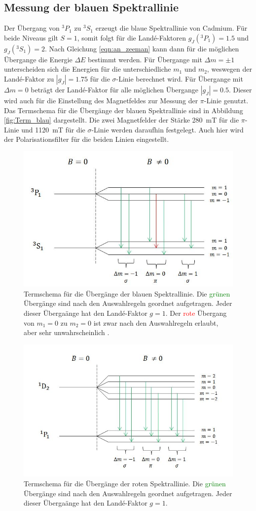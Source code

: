 \subsection{Messung der blauen Spektrallinie}
Der Übergang von $^3P_1$ zu $^3S_1$ erzeugt die blaue Spektrallinie von Cadmium.
Für beide Niveaus gilt $S=1$, somit folgt für die Landé-Faktoren $g_J(^3P_1) = \num{1.5}$ und $g_J(^3S_1) = \num{2}$.
Nach Gleichung \ref{eqn:an_zeeman} kann dann für die möglichen Übergange die Energie $\Delta E$ bestimmt werden.
Für Übergange mit $\Delta m = \pm 1$ unterscheiden sich die Energien für die unterschiedliche $m_1$ und $m_2$, weswegen der Landé-Faktor zu $|g_J| = \num{1.75}$ für die $\sigma$-Linie berechnet wird.
Für Übergange mit $\Delta m = 0$ beträgt der Landé-Faktor für alle möglichen Übergange $|g_J| = \num{0.5}$.
Dieser wird auch für die Einstellung des Magnetfeldes zur Messung der $\pi$-Linie genutzt.
Das Termschema für die Übergänge der blauen Spektrallinie sind in Abbildung \ref{fig:Term_blau} dargestellt.
Die zwei Magnetfelder der Stärke \SI{280}{\milli\tesla} für die $\pi$-Linie und \SI{1120}{\milli\tesla} für die $\sigma$-Linie werden daraufhin festgelegt.
Auch hier wird der Polarisationsfilter für die beiden Linien eingestellt.

\begin{figure}[H]
  \centering
  \includegraphics[width = .6\textwidth]{images/termschema_blau.jpg}
  \caption{Termschema für die Übergänge der blauen Spektrallinie. Die \textcolor{green}{grünen} Übergänge sind nach den Auswahlregeln geordnet aufgetragen. Jeder dieser Übergaänge hat den Landé-Faktor $g=1$. Der \textcolor{red}{rote} Übergang von $m_1 = 0$ zu $m_2=0$ ist zwar nach den Auswahlregeln erlaubt, aber sehr unwahrscheinlich \cite{Janina}.}
  \label{fig:Term_rot.}
\end{figure}

\begin{figure}[H]
  \centering
  \includegraphics[width = .6\textwidth]{images/termschema_rot.jpg}
  \caption{Termschema für die Übergänge der roten Spektrallinie. Die \textcolor{green}{grünen} Übergänge sind nach den Auswahlregeln geordnet aufgetragen. Jeder dieser Übergaänge hat den Landé-Faktor $g=1$.}
  \label{fig:Term_rot.}
\end{figure}
